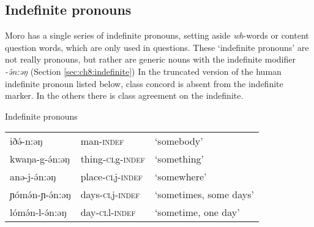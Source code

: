 %
%
%
%
%

\subsection{Indefinite pronouns}%
\label{sec:ch8:indpro}

Moro has a single series of indefinite pronouns, setting aside \textit{wh}-words or content question words, which are only used in questions. These `indefinite pronouns' are not really pronouns, but rather are generic nouns with the indefinite modifier \textit{-ə́n:əŋ} (Section \ref{sec:ch8:indefinite}) In the truncated version of the human indefinite pronoun listed below, class concord is absent from the indefinite marker. In the others there is class agreement on the indefinite.

\ea Indefinite pronouns\\ \label{indefpro}
\begin{tabular}[t]{lll}
iðə́-n:əŋ		& man-\textsc{indef} & ‘somebody’ \\
kwaŋa-g-ə́n:əŋ	& thing-\textsc{cl}g-\textsc{indef} & ‘something’\\
anə-j-ə́n:əŋ		& place-\textsc{cl}j-\textsc{indef} & ‘somewhere’\\
ɲómə́n-ɲ-ə́n:əŋ		& days-\textsc{cl}j-\textsc{indef} & ‘sometimes, some days’\\
lómə́n-l-ə́n:əŋ	& day-\textsc{cl}l-\textsc{indef} & ‘sometime, one day’\\\end{tabular} 
\z

